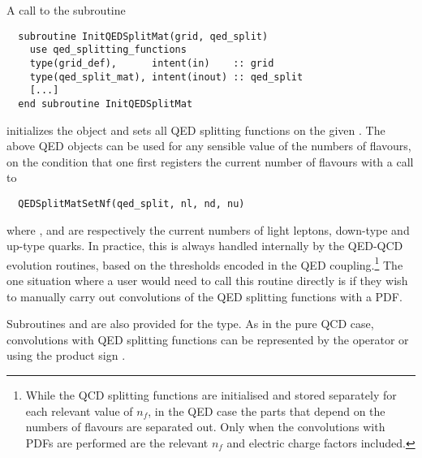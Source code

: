 A call to the subroutine 
\begin{lstlisting}     
  subroutine InitQEDSplitMat(grid, qed_split)
    use qed_splitting_functions
    type(grid_def),      intent(in)    :: grid
    type(qed_split_mat), intent(inout) :: qed_split
    [...]
  end subroutine InitQEDSplitMat
\end{lstlisting}     
initializes the  object  and sets all QED
splitting functions on the given .
%
The above QED objects can be used for any sensible value of the
numbers of flavours, on the condition that one first registers
the current number of flavours with a call to
\begin{lstlisting}
  QEDSplitMatSetNf(qed_split, nl, nd, nu)
\end{lstlisting}
where ,  and  are respectively the current
numbers of light leptons, down-type and up-type quarks.
%
In practice, this is always handled internally by the QED-QCD
evolution routines, based on the thresholds encoded in the QED
coupling.\footnote{While the QCD splitting functions are initialised
  and stored separately for each relevant value of $n_f$, in the QED
  case the parts that depend on the numbers of flavours are separated
  out.
  Only when the convolutions with PDFs are performed are the relevant
  $n_f$ and electric charge factors included.}
%
The one situation where a user would need to call this routine
directly is if they wish to manually carry out convolutions of the
QED splitting functions with a PDF.

Subroutines  and  are also provided for the
 type. As in the pure QCD case, convolutions with
QED splitting functions can be represented by the  operator or
using the product sign \ttt{*}.



